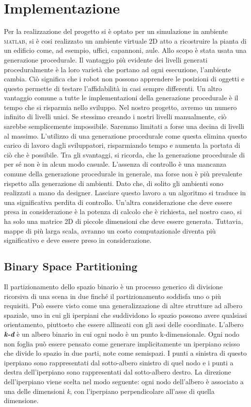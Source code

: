 \section{Implementazione}

Per la realizzazione del progetto si è optato per un simulazione in ambiente \textsc{matlab}, si è cosi realizzato un ambiente virtuale 2D atto a ricostruire la pianta di un edificio come, ad esempio, uffici, capannoni, aule. Allo scopo è stata usata una generazione procedurale.
Il vantaggio più evidente dei livelli generati proceduralmente è la loro varietà che portano ad ogni esecuzione, l'ambiente cambia. Ciò significa che i robot non possono apprendere le posizioni di oggetti e questo permette di testare l'affidabilità in casi sempre differenti.
Un altro vantaggio comune a tutte le implementazioni della generazione procedurale è il tempo che si risparmia nello sviluppo. Nel nostro progetto, avremo un numero infinito di livelli unici. Se stessimo creando i nostri livelli manualmente, ciò sarebbe semplicemente impossibile. Saremmo limitati a forse una decina di livelli al massimo.
L'utilizzo di una generazione procedurale come questa elimina questo carico di lavoro dagli sviluppatori, risparmiando tempo e aumenta la portata di ciò che è possibile.
Tra gli svantaggi, si ricorda, che la generazione procedurale di per sé non è in alcun modo casuale. 
L'assenza di controllo è una mancanza comune della generazione procedurale in generale, ma forse non è più prevalente rispetto alla generazione di ambienti. Dato che, di solito gli ambienti sono realizzati a mano da designer. Lasciare questo lavoro a un algoritmo si traduce in una significativa perdita di controllo.
Un'altra considerazione che deve essere presa in considerazione è la potenza di calcolo che è richiesta, nel nostro caso, si ha solo una matrice 2D di piccole dimensioni che deve essere generata. Tuttavia, mappe di più larga scala, avranno un costo computazionale diventa più significativo e deve essere preso in considerazione.\cite{green2016procedural}

\subsection{Binary Space Partitioning}
Il partizionamento dello spazio binario è un processo generico di divisione ricorsiva di una scena in due finché il partizionamento soddisfa uno o più requisiti. Può essere visto come una generalizzazione di altre strutture ad albero spaziale, uno in cui gli iperpiani che suddividono lo spazio possono avere qualsiasi orientamento, piuttosto che essere allineati con gli assi delle coordinate.\cite{wiki:bsp}
L'albero \textbf{\emph{k-d}} è un albero binario in cui ogni nodo è un punto k-dimensionale. Ogni nodo non foglia può essere pensato come generare implicitamente un iperpiano scisso che divide lo spazio in due parti, note come semispazi. I punti a sinistra di questo iperpiano sono rappresentati dal sotto-albero sinistro di quel nodo e i punti a destra dell'iperpiano sono rappresentati dal sotto-albero destro. La direzione dell'iperpiano viene scelta nel modo seguente: ogni nodo dell'albero è associato a una delle dimensioni \emph{k}, con l'iperpiano perpendicolare all'asse di quella dimensione.\cite{wiki:kdtree}

